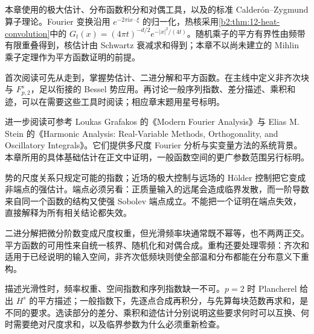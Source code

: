 本章使用的极大估计、分布函数积分和对偶工具，以及的标准 Calderón--Zygmund 算子理论。Fourier 变换沿用 \(e^{-2\pi\mathrm i x\cdot\xi}\) 的归一化，热核采用\cref{b2:thm:12-heat-convolution}中的 \(G_t(x)=(4\pi t)^{-d/2}e^{-|x|^2/(4t)}\)。随机乘子的平方有界性由频带有限重叠得到，核估计由 Schwartz 衰减求和得到；本章不以尚未建立的 Mihlin 乘子定理作为平方函数证明的前提。

\ProseParagraphBreak

首次阅读可先从走到，掌握势估计、二进分解和平方函数。在主线中定义非齐次块与 \(F^s_{p,2}\)，足以衔接的 Bessel 势应用。再讨论一般序列指数、差分描述、乘积和迹，可以在需要这些工具时阅读；相应章末题用星号标明。

\ProseParagraphBreak

进一步阅读可参考 Loukas Grafakos 的《Modern Fourier Analysis》\cite{Grafakos2014Modern}与 Elias M. Stein 的《Harmonic Analysis: Real-Variable Methods, Orthogonality, and Oscillatory Integrals》\cite{Stein1993Harmonic}。它们提供多尺度 Fourier 分析与实变量方法的系统背景。本章所用的具体基础估计在正文中证明，一般函数空间的更广参数范围另行标明。







\begin{chaptersummary}
势的尺度关系只规定可能的指数；近场的极大控制与远场的 Hölder 控制把它变成非端点的强估计。端点必须另看：正质量输入的远尾会造成临界发散，而一阶导数来自同一个函数的结构又使强 Sobolev 端点成立。不能把一个证明在端点失效，直接解释为所有相关结论都失效。

\ProseParagraphBreak

二进分解把微分阶数变成尺度权重，但光滑频率块通常既不幂等，也不两两正交。平方函数的可用性来自统一核界、随机化和对偶合成。重构还要处理零频：齐次和适用于已经说明的输入空间，非齐次低频块则使全部温和分布都能在分布意义下重构。

\ProseParagraphBreak

描述光滑性时，频率权重、空间指数和序列指数缺一不可。\(p=2\) 时 Plancherel 给出 \(H^s\) 的平方描述；一般指数下，先逐点合成再积分，与先算每块范数再求和，是不同的要求。选读部分的差分、乘积和迹估计分别说明这些要求何时可以互换、何时需要绝对尺度求和，以及临界参数为什么必须重新检查。
\end{chaptersummary}

